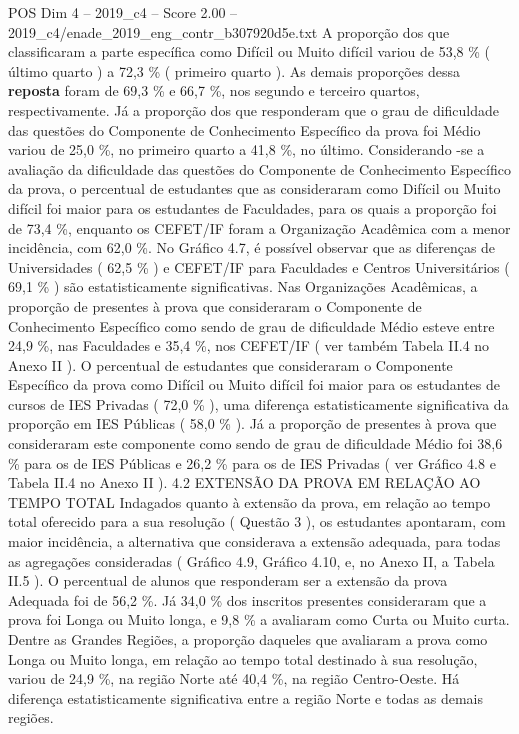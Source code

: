 \begin{textsample}{POS Dim 4 – 2019\_c4 – Score 2.00 – 2019\_c4/enade\_2019\_eng\_contr\_b307920d5e.txt}
A proporção dos que classificaram a parte específica como Difícil ou Muito difícil variou de 53,8 \% ( último quarto ) a 72,3 \% ( primeiro quarto ).
As demais proporções dessa \textbf{reposta} foram de 69,3 \% e 66,7 \%, nos segundo e terceiro quartos, respectivamente.
Já a proporção dos que responderam que o grau de dificuldade das questões do Componente de Conhecimento Específico da prova foi Médio variou de 25,0 \%, no primeiro quarto a 41,8 \%, no último.
Considerando -se a avaliação da dificuldade das questões do Componente de Conhecimento Específico da prova, o percentual de estudantes que as consideraram como Difícil ou Muito difícil foi maior para os estudantes de Faculdades, para os quais a proporção foi de 73,4 \%, enquanto os CEFET/IF foram a Organização Acadêmica com a menor incidência, com 62,0 \%.
No Gráfico 4.7, é possível observar que as diferenças de Universidades ( 62,5 \% ) e CEFET/IF para Faculdades e Centros Universitários ( 69,1 \% ) são estatisticamente significativas.
Nas Organizações Acadêmicas, a proporção de presentes à prova que consideraram o Componente de Conhecimento Específico como sendo de grau de dificuldade Médio esteve entre 24,9 \%, nas Faculdades e 35,4 \%, nos CEFET/IF ( ver também Tabela II.4 no Anexo II ).
O percentual de estudantes que consideraram o Componente Específico da prova como Difícil ou Muito difícil foi maior para os estudantes de cursos de IES Privadas ( 72,0 \% ), uma diferença estatisticamente significativa da proporção em IES Públicas ( 58,0 \% ).
Já a proporção de presentes à prova que consideraram este componente como sendo de grau de dificuldade Médio foi 38,6 \% para os de IES Públicas e 26,2 \% para os de IES Privadas ( ver Gráfico 4.8 e Tabela II.4 no Anexo II ). 4.2 EXTENSÃO DA PROVA EM RELAÇÃO AO TEMPO TOTAL Indagados quanto à extensão da prova, em relação ao tempo total oferecido para a sua resolução ( Questão 3 ), os estudantes apontaram, com maior incidência, a alternativa que considerava a extensão adequada, para todas as agregações consideradas ( Gráfico 4.9, Gráfico 4.10, e, no Anexo II, a Tabela II.5 ).
O percentual de alunos que responderam ser a extensão da prova Adequada foi de 56,2 \%.
Já 34,0 \% dos inscritos presentes consideraram que a prova foi Longa ou Muito longa, e 9,8 \% a avaliaram como Curta ou Muito curta.
Dentre as Grandes Regiões, a proporção daqueles que avaliaram a prova como Longa ou Muito longa, em relação ao tempo total destinado à sua resolução, variou de 24,9 \%, na região Norte até 40,4 \%, na região Centro-Oeste.
Há diferença estatisticamente significativa entre a região Norte e todas as demais regiões.

\end{textsample}
